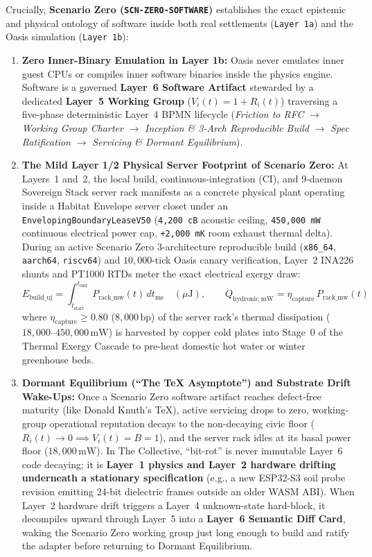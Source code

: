 Crucially, \textbf{Scenario Zero (\texttt{SCN-ZERO-SOFTWARE})} establishes the exact epistemic and physical ontology of software inside both real settlements (\texttt{Layer 1a}) and the Oasis simulation (\texttt{Layer 1b}):
\begin{enumerate}
    \item \textbf{Zero Inner-Binary Emulation in Layer 1b:} Oasis never emulates inner guest CPUs or compiles inner software binaries inside the physics engine. Software is a governed \textbf{Layer~6 Software Artifact} stewarded by a dedicated \textbf{Layer~5 Working Group} ($V_i(t) = 1 + R_i(t)$) traversing a five-phase deterministic Layer~4 BPMN lifecycle (\textit{Friction to RFC} $\to$ \textit{Working Group Charter} $\to$ \textit{Inception \& 3-Arch Reproducible Build} $\to$ \textit{Spec Ratification} $\to$ \textit{Servicing \& Dormant Equilibrium}).
    \item \textbf{The Mild Layer 1/2 Physical Server Footprint of Scenario Zero:} At Layers~1 and~2, the local build, continuous-integration (CI), and 9-daemon Sovereign Stack server rack manifests as a concrete physical plant operating inside a Habitat Envelope server closet under an \texttt{EnvelopingBoundaryLeaseV50} (\texttt{4,200 cB} acoustic ceiling, \texttt{450,000 mW} continuous electrical power cap, \texttt{+2,000 mK} room exhaust thermal delta). During an active Scenario Zero 3-architecture reproducible build (\texttt{x86\_64}, \texttt{aarch64}, \texttt{riscv64}) and $10{,}000$-tick Oasis canary verification, Layer~2 INA226 shunts and PT1000 RTDs meter the exact electrical exergy draw:
    \begin{equation}
    E_{\mathrm{build\_uj}} = \int_{t_{\mathrm{start}}}^{t_{\mathrm{end}}} P_{\mathrm{rack\_mw}}(t) \, dt_{\mathrm{ms}} \quad (\mu\mathrm{J}), \qquad \dot{Q}_{\mathrm{hydronic\_mW}} = \eta_{\mathrm{capture}} \, P_{\mathrm{rack\_mw}}(t)
    \label{eq:scenario_zero_server_footprint}
    \end{equation}
    where $\eta_{\mathrm{capture}} \ge 0.80$ ($8{,}000\,\mathrm{bp}$) of the server rack's thermal dissipation ($18{,}000\text{--}450{,}000\,\mathrm{mW}$) is harvested by copper cold plates into Stage~0 of the Thermal Exergy Cascade to pre-heat domestic hot water or winter greenhouse beds.
    \item \textbf{Dormant Equilibrium (``The TeX Asymptote'') and Substrate Drift Wake-Ups:} Once a Scenario Zero software artifact reaches defect-free maturity (like Donald Knuth's \TeX{}), active servicing drops to zero, working-group operational reputation decays to the non-decaying civic floor ($R_i(t) \to 0 \implies V_i(t) = B = 1$), and the server rack idles at its basal power floor ($18{,}000\,\mathrm{mW}$). In The Collective, ``bit-rot'' is never immutable Layer~6 code decaying; it is \textbf{Layer~1 physics and Layer~2 hardware drifting underneath a stationary specification} (e.g., a new ESP32-S3 soil probe revision emitting 24-bit dielectric frames outside an older WASM ABI). When Layer~2 hardware drift triggers a Layer~4 unknown-state hard-block, it decompiles upward through Layer~5 into a \textbf{Layer~6 Semantic Diff Card}, waking the Scenario Zero working group just long enough to build and ratify the adapter before returning to Dormant Equilibrium.

\end{enumerate}
